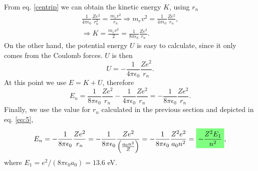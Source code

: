\begin{questions}
\begin{solution}
  From eq. \ref{centrip} we can obtain the kinetic energy $K$, using $r_n$
  \begin{eqnarray}
\frac{1}{4\pi\epsilon_0}\frac{Ze^2}{r_n^2} = \frac{m_ev^2}{r_n}
\Rightarrow m_ev^2 = \frac{1}{4\pi\epsilon_0}\frac{Ze^2}{r_n},\nonumber\\
\Rightarrow K = \frac{m_ev^2}{2} = \frac{1}{8\pi\epsilon_0}\frac{Ze^2}{r_n}.
\end{eqnarray}
On the other hand, the potential energy $U$ is easy to calculate, since it only comes from the Coulomb forces. $U$ is then
\begin{equation}
  U = - \frac{1}{4\pi\epsilon_0}\frac{Ze^2}{r_n}.
\end{equation}
At this point we use $E = K + U$, therefore
\begin{equation}
  E_n = \frac{1}{8\pi\epsilon_0}\frac{Ze^2}{r_n} - \frac{1}{4\pi\epsilon_0}\frac{Ze^2}{r_n} = - \frac{1}{8\pi\epsilon_0}\frac{Ze^2}{r_n}.
\end{equation}
Finally, we use the value for $r_n$ calculated in the previous section and depicted in eq. \ref{eq:5},
\begin{equation}
  E_n = - \frac{1}{8\pi\epsilon_0}\frac{Ze^2}{r_n}
   = - \frac{1}{8\pi\epsilon_0}\frac{Ze^2}{\left(\frac{a_0n^2}{Z}\right)}
   = - \frac{1}{8\pi\epsilon_0}\frac{Z^2e^2}{a_0n^2} = \hlgreen{-\frac{Z^2 E_1}{n^2}},
\end{equation}
where $E_1 = e^2/(8\pi\epsilon_0a_0) = 13.6$ eV.
\end{solution}
\end{questions}
